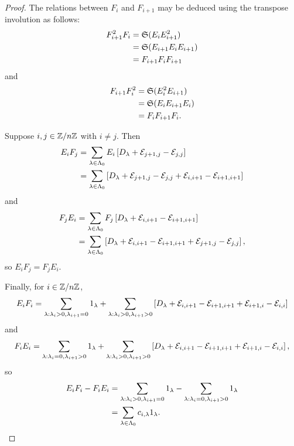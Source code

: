 \documentclass[a4paper, 11pt, twoside]{report}
\begin{document}
\begin{proof}
The relations between $F_i$ and $F_{i+1}$ may be deduced using the transpose involution as follows:
\begin{align*}
F_{i+1}^2F_i
&= \mathfrak{S}{(E_iE_{i+1}^2)}\\
&= \mathfrak{S}{(E_{i+1}E_iE_{i+1})}\\
&= F_{i+1}F_iF_{i+1}
\end{align*}
and
\begin{align*}
F_{i+1}F_i^2
&= \mathfrak{S}{(E_i^2E_{i+1})}\\
&= \mathfrak{S}{(E_iE_{i+1}E_i)}\\
&= F_iF_{i+1}F_i.
\end{align*}

Suppose $i,j\in\mathbb{Z}/{n \mathbb{Z}}$ with $i\neq j$. Then
\begin{align*}
E_iF_j &= \sum_{\lambda\in\Lambda_0{}} E_i\left[D_{\lambda}+\mathcal{E}_{j+1,j}-\mathcal{E}_{j,j}\right]\\
&= \sum_{\lambda\in\Lambda_0{}} \left[D_{\lambda}+\mathcal{E}_{j+1,j}-\mathcal{E}_{j,j}+\mathcal{E}_{i,i+1}-\mathcal{E}_{i+1,i+1}\right]
\end{align*}
and
\begin{align*}
F_jE_i &= \sum_{\lambda\in\Lambda_0{}} F_j\left[D_{\lambda}+\mathcal{E}_{i,i+1}-\mathcal{E}_{i+1,i+1}\right]\\
&= \sum_{\lambda\in\Lambda_0{}} \left[D_{\lambda}+\mathcal{E}_{i,i+1}-\mathcal{E}_{i+1,i+1}+\mathcal{E}_{j+1,j}-\mathcal{E}_{j,j}\right],
\end{align*}
so $E_iF_j=F_jE_i$.

Finally, for $i\in\mathbb{Z}/{n \mathbb{Z}}$,
\begin{equation*}
E_iF_i = \sum_{\lambda:\lambda_i>0,\lambda_{i+1}=0}1_\lambda +\sum_{\lambda:\lambda_i>0,\lambda_{i+1}>0}\left[D_{\lambda}+\mathcal{E}_{i,i+1}-\mathcal{E}_{i+1,i+1}+\mathcal{E}_{i+1,i}-\mathcal{E}_{i,i}\right]
\end{equation*}
and
\begin{equation*}
F_iE_i = \sum_{\lambda:\lambda_i=0,\lambda_{i+1}>0}1_\lambda +\sum_{\lambda:\lambda_i>0,\lambda_{i+1}>0}\left[D_{\lambda}+\mathcal{E}_{i,i+1}-\mathcal{E}_{i+1,i+1}+\mathcal{E}_{i+1,i}-\mathcal{E}_{i,i}\right],
\end{equation*}
so
\begin{align*}
E_iF_i-F_iE_i &= \sum_{\lambda:\lambda_i>0,\lambda_{i+1}=0}1_\lambda -\sum_{\lambda:\lambda_i=0,\lambda_{i+1}>0}1_\lambda\\
&= \sum_{\lambda\in\Lambda_0{}} c_{i,\lambda}1_\lambda.
\end{align*}
\end{proof}
\end{document}
